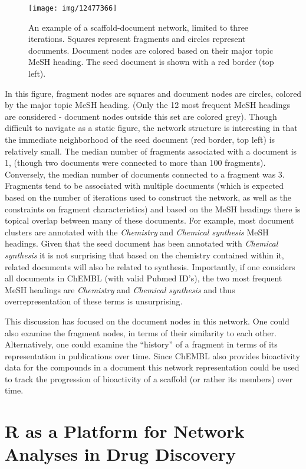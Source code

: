 \documentclass[]{book}
\begin{document}
\begin{figure}[h]
  \centering
  \texttt{[image: img/12477366]}
  \caption{An example of a scaffold-document network, limited to three
    iterations. Squares represent fragments and circles represent
    documents. Document nodes are colored based on their major topic
    MeSH heading. The seed document is shown with a red border (top
    left).}
  \label{fig:scafdocnet}
\end{figure}
In this figure, fragment nodes are squares and document nodes are
circles, colored by the major topic MeSH heading. (Only the 12 most
frequent MeSH headings are considered - document nodes outside this
set are colored grey). Though difficult to navigate as a static  
figure, the network structure is interesting in that the immediate
neighborhood of the seed document (red border, top left) is relatively
small. The median number of fragments associated with a document is 1,
(though two documents were connected to more than 100
fragments). Conversely, the median number of documents connected to a
fragment was 3. Fragments tend to be associated with multiple
documents (which is expected based on the number of iterations used to
construct the network, as well as the constraints on fragment
characteristics) and based on the MeSH headings there is topical
overlap between many of these documents. For example, most document
clusters are annotated with the \emph{Chemistry} and \emph{Chemical
  synthesis} MeSH headings. Given that the seed document has been
annotated with \emph{Chemical synthesis} it is not surprising that
based on the chemistry contained within it, related documents will
also be related to synthesis. Importantly, if one considers all
documents in ChEMBL (with valid Pubmed ID's), the two most frequent
MeSH headings are \emph{Chemistry} and \emph{Chemical synthesis} and
thus overrepresentation of these terms is unsurprising. 

This discussion has focused on the document nodes in this network. One
could also examine the fragment nodes, in terms of their similarity to
each other. Alternatively, one could examine the ``history'' of a
fragment in terms of its representation in publications over
time. Since ChEMBL also provides bioactivity data for the compounds in
a document this network representation could be used to track the
progression of bioactivity of a scaffold (or rather its members) over
time.

\section{R as a Platform for Network Analyses in Drug Discovery}
\label{sec:r-as-platform}
\end{document}
